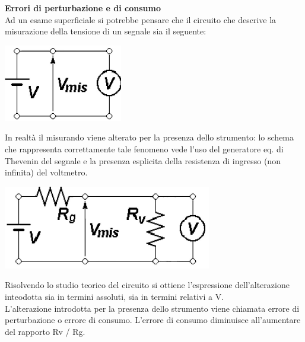 \documentclass{article}
\begin{document}
\textbf{Errori di perturbazione e di consumo }\\
Ad un esame superficiale si potrebbe pensare che il circuito che descrive la misurazione della 
tensione di un segnale sia il seguente:
\begin{center}
    \includegraphics[scale=0.9]{Circuito Misurazione Tensione 1.png}
\end{center}
In realtà il misurando viene alterato per la presenza dello strumento: lo schema che rappresenta 
correttamente tale fenomeno vede l'uso del generatore eq. di Thevenin del segnale e la presenza 
esplicita della resistenza di ingresso (non infinita) del voltmetro. 
\begin{center}
    \includegraphics[scale=0.9]{Circuito Misurazione Tensione 2.png}
\end{center}
Risolvendo lo studio teorico del circuito si ottiene l’espressione dell’alterazione inteodotta sia in 
termini assoluti, sia in termini relativi a V. \\
L’alterazione introdotta per la presenza dello strumento viene chiamata errore di perturbazione o 
errore di consumo. L'errore di consumo diminuisce all'aumentare del rapporto Rv / Rg.
\end{document}
